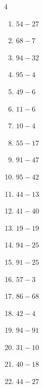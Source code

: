 \begin{multicols}{4}
\begin{enumerate}
  \item $54-27$
        \phantom{$=27$}

  \item $68-7$
        \phantom{$=61$}

  \item $94-32$
        \phantom{$=62$}

  \item $95-4$
        \phantom{$=91$}

  \item $49-6$
        \phantom{$=43$}

  \item $11-6$
        \phantom{$=5$}

  \item $10-4$
        \phantom{$=6$}

  \item $55-17$
        \phantom{$=38$}

  \item $91-47$
        \phantom{$=44$}

  \item $95-42$
        \phantom{$=53$}

  \item $44-13$
        \phantom{$=31$}

  \item $41-40$
        \phantom{$=1$}

  \item $19-19$
        \phantom{$=0$}

  \item $94-25$
        \phantom{$=69$}

  \item $91-25$
        \phantom{$=66$}

  \item $57-3$
        \phantom{$=54$}

  \item $86-68$
        \phantom{$=18$}

  \item $42-4$
        \phantom{$=38$}

  \item $94-91$
        \phantom{$=3$}

  \item $31-10$
        \phantom{$=21$}

  \item $40-18$
        \phantom{$=22$}

  \item $44-27$
        \phantom{$=17$}


\end{enumerate}
\end{multicols}
